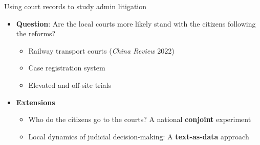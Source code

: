 \documentclass[
  10pt,
  ignorenonframetext,
]{beamer}
\begin{document}
\begin{frame}{Using court records to study admin litigation}
\label{using-court-records-to-study-admin-litigation-1}
\begin{itemize}
  \item \textbf{Question}: Are the local courts more likely stand with the citizens following the reforms?
  \vspace{0.2cm}
  \begin{itemize}
    \item Railway transport courts (\textit{China Review} 2022)
    \item Case registration system
    \item Elevated and off-site trials
  \end{itemize}
  \vspace{0.6cm}
  \item \textbf{Extensions}
  \vspace{0.2cm}
  \begin{itemize}
    \item Who do the citizens go to the courts? A national \textbf{conjoint} experiment
    \item Local dynamics of judicial decision-making: A \textbf{text-as-data} approach
  \end{itemize}
\end{itemize}
\end{frame}
\end{document}
